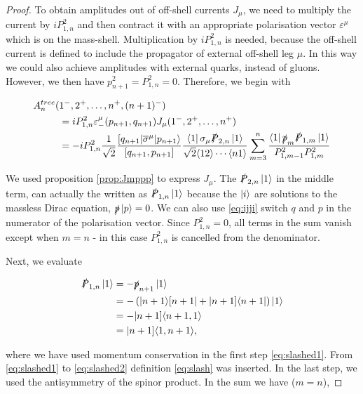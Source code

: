 \documentclass{article}
\theoremstyle{definition}
\numberwithin{equation}{section}
\begin{document}
\begin{proof}
To obtain amplitudes out of off-shell currents $J_{\mu}$, we need to multiply the current by $i P_{1,n}^2$ and then contract it with an appropriate polarisation vector $\varepsilon^{\mu}$ which is on the mass-shell. Multiplication by $i P_{1,n}^2$ is needed, because the off-shell current is defined to include the propagator of external off-shell leg $\mu$. In this way we could also achieve amplitudes with external quarks, instead of gluons. However, we then have $p_{n+1}^2 = P_{1,n}^2 = 0$. Therefore, we begin with

\begin{align}
    A_n^{tree}(&1^{-}, 2^{+}, \dots , n^{+}, (n+1)^{-}) \\
    &= i P_{1,n}^2 \varepsilon_{-}^{\mu}(p_{n+1}, q_{n+1}) J_{\mu}(1^{-}, 2^{+}, \dots , n^{+}) \\
    &= - i P_{1,n}^2 \frac{1}{\sqrt{2}} \frac{ \lbrack q_{n+1} | \overline{\sigma}^{\mu} | p_{n+1} \rangle }{ \lbrack q_{n+1}, p_{n+1} \rbrack } \frac{ \bra{1} \sigma_{\mu} \slashed{P}_{2,n} \ket{1} }{ \sqrt{2} \langle 12 \rangle \cdots \langle n1 \rangle } \sum_{m=3}^{n} \frac{ \bra{1} \slashed{p}_m \slashed{P}_{1,m} \ket{1} }{ P_{1,m-1}^2 P_{1,m}^2 }
\end{align}

We used proposition \ref{prop:Jmppp} to express $J_{\mu}$. The $\slashed{P}_{2,n} \ket{1}$ in the middle term, can actually the written as $\slashed{P}_{1,n} \ket{1}$ because the $\ket{i}$ are solutions to the massless Dirac equation, $\slashed{p} \ket{p} = 0$. We can also use \eqref{eq:ijji} switch $q$ and $p$ in the numerator of the polarisation vector. Since $P_{1,n}^2 = 0$, all terms in the sum vanish except when $m=n$ - in this case $P_{1,n}^2$ is cancelled from the denominator.

Next, we evaluate

\begin{align}
    \slashed{P}_{1,n} \ket{1} &= - \slashed{p}_{n+1} \ket{1} \label{eq:slashed1} \\
    &= - \left( | n+1 \rangle \lbrack n+1 | + | n+1 \rbrack \langle n+1 | \right) \ket{1} \label{eq:slashed2} \\
    &= - | n+1 \rbrack \langle n+1,1 \rangle \label{eq:slashed3} \\
    &= | n+1 \rbrack \langle 1,n+1 \rangle, \label{eq:slashed4}
\end{align}

where we have used momentum conservation in the first step \eqref{eq:slashed1}. From \eqref{eq:slashed1} to \eqref{eq:slashed2} definition \eqref{eq:slash} was inserted. In the last step, we used the antisymmetry of the spinor product. In the sum we have ($m=n$),


\end{proof}
\end{document}
